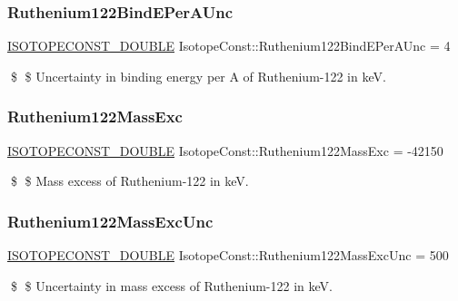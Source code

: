 \subsubsection{\texorpdfstring{Ruthenium122\+Bind\+E\+Per\+A\+Unc}{Ruthenium122BindEPerAUnc}}
{\footnotesize\ttfamily \mbox{\hyperlink{group___isotope_const-_macros_ga8f45a7272ce02c0b4c65c44636ed719a}{I\+S\+O\+T\+O\+P\+E\+C\+O\+N\+S\+T\+\_\+\+D\+O\+U\+B\+LE}} Isotope\+Const\+::\+Ruthenium122\+Bind\+E\+Per\+A\+Unc = 4}

\$ \$ Uncertainty in binding energy per A of Ruthenium-\/122 in keV. \mbox{\label{group___isotope_const-_ruthenium-_ru122_gab2a74561f09593c1d55b3e04b59c9fbe}} 
\subsubsection{\texorpdfstring{Ruthenium122\+Mass\+Exc}{Ruthenium122MassExc}}
{\footnotesize\ttfamily \mbox{\hyperlink{group___isotope_const-_macros_ga8f45a7272ce02c0b4c65c44636ed719a}{I\+S\+O\+T\+O\+P\+E\+C\+O\+N\+S\+T\+\_\+\+D\+O\+U\+B\+LE}} Isotope\+Const\+::\+Ruthenium122\+Mass\+Exc = -\/42150}

\$ \$ Mass excess of Ruthenium-\/122 in keV. \mbox{\label{group___isotope_const-_ruthenium-_ru122_ga7d0ca95cf4055f7f403c6b2295a77ed4}} 
\subsubsection{\texorpdfstring{Ruthenium122\+Mass\+Exc\+Unc}{Ruthenium122MassExcUnc}}
{\footnotesize\ttfamily \mbox{\hyperlink{group___isotope_const-_macros_ga8f45a7272ce02c0b4c65c44636ed719a}{I\+S\+O\+T\+O\+P\+E\+C\+O\+N\+S\+T\+\_\+\+D\+O\+U\+B\+LE}} Isotope\+Const\+::\+Ruthenium122\+Mass\+Exc\+Unc = 500}

\$ \$ Uncertainty in mass excess of Ruthenium-\/122 in keV. \mbox{\label{group___isotope_const-_ruthenium-_ru122_gafa0ec53d8f5fa953424c51aa8b0a177c}} 
